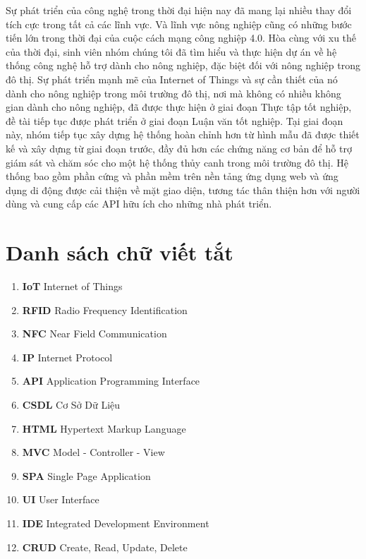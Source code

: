 \documentclass[a4paper,12pt,oneside]{article}
\begin{document}
Sự phát triển của công nghệ trong thời đại hiện nay đã  mang lại nhiều thay đổi tích cực trong tất cả các lĩnh vực. Và lĩnh vực nông nghiệp cũng có những bước tiến lớn trong thời đại của cuộc cách mạng công nghiệp 4.0. Hòa cùng với xu thế của thời đại, sinh viên nhóm chúng tôi đã tìm hiểu và thực hiện dự án về hệ thống công nghệ hỗ trợ dành cho nông nghiệp, đặc biệt đối với nông nghiệp trong đô thị. Sự phát triển mạnh mẽ của Internet of Things và sự cần thiết của nó dành cho nông nghiệp trong môi trường đô thị, nơi mà không có nhiều không gian dành cho nông nghiệp, đã được thực hiện ở giai đoạn Thực tập tốt nghiệp, đề tài tiếp tục được phát triển ở giai đoạn Luận văn tốt nghiệp. Tại giai đoạn này, nhóm tiếp tục xây dựng hệ thống hoàn chỉnh hơn từ hình mẫu đã được thiết kế và xây dựng từ giai đoạn trước, đầy đủ hơn các chứng năng cơ bản để hỗ trợ giám sát và chăm sóc cho một hệ thống thủy canh trong môi trường đô thị. Hệ thống bao gồm phần cứng và phần mềm trên nền tảng ứng dụng web và ứng dụng di động được cải thiện về mặt giao diện, tương tác thân thiện hơn với người dùng và cung cấp các API hữu ích cho những nhà phát triển.

\newpage
\tableofcontents

\newpage
\listoffigures

\newpage
\listoftables

\newpage
\section*{Danh sách chữ viết tắt}
\label{sec:dsvt}

\begin{enumerate}
\item \textbf{IoT} Internet of Things
\item \textbf{RFID} Radio Frequency Identification
\item \textbf{NFC} Near Field Communication
\item \textbf{IP} Internet Protocol
\item \textbf{API} Application Programming Interface
\item \textbf{CSDL} Cơ Sở Dữ Liệu
\item \textbf{HTML} Hypertext Markup Language
\item \textbf{MVC} Model - Controller - View
\item \textbf{SPA} Single Page Application
\item \textbf{UI} User Interface
\item \textbf{IDE} Integrated Development
 Environment
 \item \textbf{CRUD} Create, Read, Update, Delete
\end{enumerate}
\end{document}
